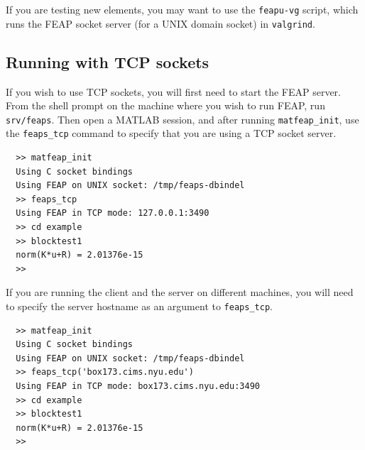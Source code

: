 \documentclass[12pt]{article}
\begin{document}
If you are testing new elements, you may want to use the {\tt feapu-vg}
script, which runs the FEAP socket server (for a UNIX domain socket) in
{\tt valgrind}.


\subsection{Running with TCP sockets}

If you wish to use TCP sockets, you will first need to start the FEAP
server.  From the shell prompt on the machine where you wish to run
FEAP, run {\tt srv/feaps}.  Then open a MATLAB session, and after running
{\tt matfeap\_init}, use the {\tt feaps\_tcp} command to specify that you
are using a TCP socket server.
\begin{verbatim}
  >> matfeap_init
  Using C socket bindings
  Using FEAP on UNIX socket: /tmp/feaps-dbindel
  >> feaps_tcp
  Using FEAP in TCP mode: 127.0.0.1:3490
  >> cd example
  >> blocktest1
  norm(K*u+R) = 2.01376e-15
  >>
\end{verbatim}

If you are running the client and the server on different machines, you
will need to specify the server hostname as an argument to {\tt feaps\_tcp}.
\begin{verbatim}
  >> matfeap_init
  Using C socket bindings
  Using FEAP on UNIX socket: /tmp/feaps-dbindel
  >> feaps_tcp('box173.cims.nyu.edu')
  Using FEAP in TCP mode: box173.cims.nyu.edu:3490
  >> cd example
  >> blocktest1
  norm(K*u+R) = 2.01376e-15
  >>
\end{verbatim}
\end{document}
